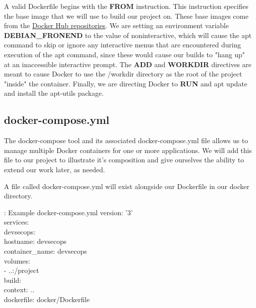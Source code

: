 \justify
A valid Dockerfile begins with the \textbf{FROM} instruction. This
instruction specifies the base image that we will use to build our
project on. These base images come from the
\href{https://docs.docker.com/docker-hub/repos/}{Docker Hub
  repositories}. We are setting an environment variable
\textbf{DEBIAN\_FRONEND} to the value of noninteractive, which will
cause the apt command to skip or ignore any interactive menus that are
encountered during execution of the apt command, since these would cause
our builds to "hang up" at an inaccessible interactive prompt. The
\textbf{ADD} and \textbf{WORKDIR} directives are meant to cause Docker
to use the /workdir directory as the root of the project "inside" the
container. Finally, we are directing Docker to \textbf{RUN} and apt
update and install the apt-utils package.

\subsection{docker-compose.yml}
\justify
The docker-compose tool and its associated docker-compose.yml file
allows us to manage multiple Docker containers for one or more
applications. We will add this file to our project to illustrate it's
composition and give ourselves the ability to extend our work later, as
needed.

\justify
A file called docker-compose.yml will exist alongside our Dockerfile in our docker directory.

\begin{mybox}{\thetcbcounter: Example docker-compose.yml}
version: '3'\\
services:\\
\hspace*{7mm}devsecops:\\
\hspace*{15mm}hostname: devsecops\\
\hspace*{15mm}container\_name: devsecops\\
\hspace*{7mm}volumes:\\
\hspace*{15mm}- ..:/project\\
\hspace*{7mm}build:\\
\hspace*{15mm}context: ..\\
\hspace*{15mm}dockerfile: docker/Dockerfile
\end{mybox}

